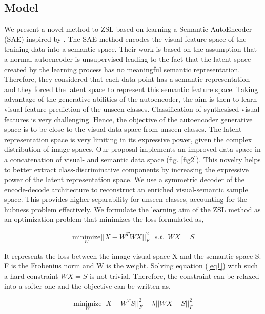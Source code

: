 \documentclass{article}
\begin{document}
\subsection{Model}

We present a novel method to ZSL based on learning a Semantic AutoEncoder (SAE) inspired by \cite{b10}. The SAE method encodes the visual feature space of the training data into a semantic space. Their work is based on the assumption that a normal autoencoder is unsupervised leading to the fact that the latent space created by the learning process has no meaningful semantic representation. Therefore, they considered that each data point has a semantic representation and they forced the latent space to represent this semantic feature space. Taking advantage of the generative abilities of the autoencoder, the aim is then to learn visual feature prediction of the unseen classes. Classification of synthesised visual features is very challenging. Hence, the objective of the autoencoder generative space is to be close to the visual data space from unseen classes. The latent representation space is very limiting in its expressive power, given the complex distribution of image spaces. Our proposal implements an improved data space in a concatenation of visual- and semantic data space (fig. \ref{fig2}). This novelty helps to better extract class-discriminative components by increasing the expressive power of the latent representation space. We use a symmetric decoder of the encode-decode architecture to reconstruct an enriched visual-semantic sample space. This provides higher separability for unseen classes, accounting for the hubness problem effectively. We formulate the learning aim of the ZSL method as an optimization problem that minimizes the loss formulated as, 

\begin{equation}
\label{eq1}
\underset{W}{\text{minimize}}||X-W^TWX||^{2}_{F}~~~s.t. ~~ WX=S
\end{equation}

It represents the loss between the image visual space X and the semantic space S. F is the Frobenius norm and W is the weight. Solving equation (\ref{eq1}) with such a hard constraint $WX=S$ is not trivial. Therefore, the constraint can be relaxed into a softer one and the objective can be written as, 

\begin{equation}
\label{eq33}
\underset{W}{\text{minimize}} ||X-W^T S||^{2}_{F} + \lambda||WX - S||^{2}_{F}
\end{equation}
\end{document}
